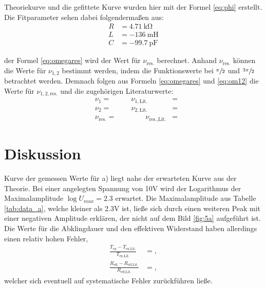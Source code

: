   Theoriekurve und die gefittete Kurve wurden hier mit der Formel \eqref{eq:phi} erstellt. Die Fitparameter
  sehen dabei folgendermaßen aus:
  \begin{align}
    R&= \SI{4.71}{\kilo\ohm}\\
    L&= \SI{-136}{\milli\henry}\\
    C&= \SI{-99.7}{\pico\farad}
  \end{align}

  \justifying der Formel \eqref{eq:omegares} wird der Wert für $\nu_{\text{res.}}$ berechnet. Anhand $\nu_{\text{res.}}$
  können die Werte für $\nu_{1,2}$ bestimmt werden, indem die Funktionswerte bei $\sfrac{\pi}{2}$ und 
  $\sfrac{3\pi}{2}$ betrachtet werden. Demnach folgen aus Formeln \eqref{eq:omegares} und \eqref{eq:om12} die Werte für $\nu_{1,2,\text{res.}}$ und die
  zugehörigen Literaturwerte:
  \begin{subequations}\label{eq:36}
  \begin{align}
    &\nu_1 = \text{} \qquad &\nu_{1,\text{Lit.}} &= \text{} \\
    &\nu_2 = \text{} \qquad &\nu_{2,\text{Lit.}} &= \text{} \\
    &\nu_{\text{res.}} = \text{} &\qquad \nu_{\text{res.,Lit.}} &= \text{}
  \end{align}
  \end{subequations}
  \newpage


\section{Diskussion}\justifying

\justifying Kurve der gemessen Werte für a) liegt nahe der erwarteten Kurve aus der Theorie. Bei einer angelegten 
Spannung von 10V wird der Logarithmus der Maximalamplitude $\log{U_{max}} = \num{2.3} $ erwartet. Die Maximalamplitude aus Tabelle \ref{tab:data_a}, 
welche kleiner als 2.3V ist, ließe sich durch einen weiteren Peak mit einer negativen Amplitude erklären, der nicht auf dem Bild 
\ref{fig:5a} aufgeführt ist. Die Werte für die Abklingdauer und den effektiven Widerstand haben allerdings einen relativ hohen Fehler,
\begin{align}
  \frac{T_{\text{ex}}-T_{\text{ex,Lit.}}}{T_{\text{ex,Lit.}}}&=\text{},\\
  \frac{R_{\text{eff}}-R_{\text{eff,Lit.}}}{R_{\text{eff,Lit.}}}&= \text{},
\end{align}
welcher sich eventuell auf systematische Fehler zurückführen ließe. 


